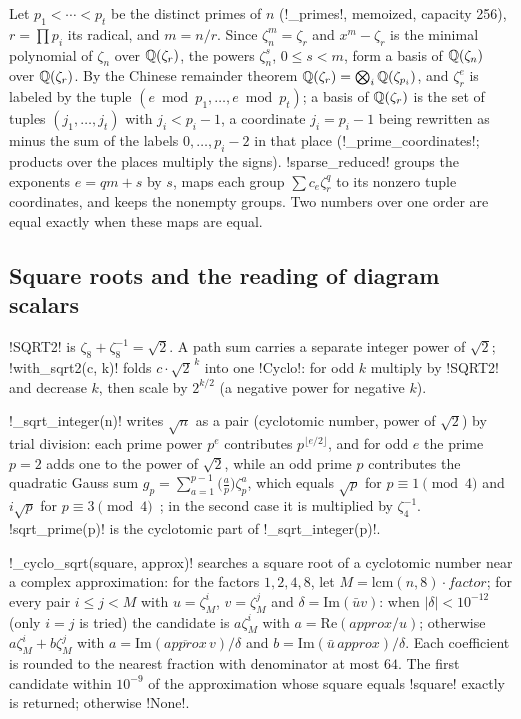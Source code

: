 \begin{definition}\label{def:algebra-cyclo-basis}
Let $p_1<\cdots<p_t$ be the distinct primes of $n$ (\py!_primes!, memoized, capacity 256), $r=\prod p_i$ its radical, and $m=n/r$. Since $\zeta_n^m=\zeta_r$ and $x^m-\zeta_r$ is the minimal polynomial of $\zeta_n$ over $\mathbb{Q}(\zeta_r)$, the powers $\zeta_n^s$, $0\le s<m$, form a basis of $\mathbb{Q}(\zeta_n)$ over $\mathbb{Q}(\zeta_r)$. By the Chinese remainder theorem $\mathbb{Q}(\zeta_r)=\bigotimes_i\mathbb{Q}(\zeta_{p_i})$, and $\zeta_r^e$ is labeled by the tuple $(e\bmod p_1,\ldots,e\bmod p_t)$; a basis of $\mathbb{Q}(\zeta_r)$ is the set of tuples $(j_1,\ldots,j_t)$ with $j_i<p_i-1$, a coordinate $j_i=p_i-1$ being rewritten as minus the sum of the labels $0,\ldots,p_i-2$ in that place (\py!_prime_coordinates!; products over the places multiply the signs). \py!sparse_reduced! groups the exponents $e=qm+s$ by $s$, maps each group $\sum c_e\zeta_r^q$ to its nonzero tuple coordinates, and keeps the nonempty groups. Two numbers over one order are equal exactly when these maps are equal.
\end{definition}

\subsection{Square roots and the reading of diagram scalars}

\py!SQRT2! is $\zeta_8+\zeta_8^{-1}=\sqrt2$. A path sum carries a separate integer power of $\sqrt2$; \py!with_sqrt2(c, k)! folds $c\cdot\sqrt2^{\,k}$ into one \py!Cyclo!: for odd $k$ multiply by \py!SQRT2! and decrease $k$, then scale by $2^{k/2}$ (a negative power for negative $k$).

\py!_sqrt_integer(n)! writes $\sqrt n$ as a pair (cyclotomic number, power of $\sqrt2$) by trial division: each prime power $p^e$ contributes $p^{\lfloor e/2\rfloor}$, and for odd $e$ the prime $p=2$ adds one to the power of $\sqrt2$, while an odd prime $p$ contributes the quadratic Gauss sum $g_p=\sum_{a=1}^{p-1}\bigl(\tfrac ap\bigr)\zeta_p^a$, which equals $\sqrt p$ for $p\equiv1\pmod4$ and $i\sqrt p$ for $p\equiv3\pmod4$~\cite{berndt1998gauss}; in the second case it is multiplied by $\zeta_4^{-1}$. \py!sqrt_prime(p)! is the cyclotomic part of \py!_sqrt_integer(p)!.

\py!_cyclo_sqrt(square, approx)! searches a square root of a cyclotomic number near a complex approximation: for the factors $1,2,4,8$, let $M=\mathrm{lcm}(n,8)\cdot\mathit{factor}$; for every pair $i\le j<M$ with $u=\zeta_M^i$, $v=\zeta_M^j$ and $\delta=\mathrm{Im}(\bar uv)$: when $|\delta|<10^{-12}$ (only $i=j$ is tried) the candidate is $a\zeta_M^i$ with $a=\mathrm{Re}(\mathit{approx}/u)$; otherwise $a\zeta_M^i+b\zeta_M^j$ with $a=\mathrm{Im}(\overline{\mathit{approx}}\,v)/\delta$ and $b=\mathrm{Im}(\bar u\,\mathit{approx})/\delta$. Each coefficient is rounded to the nearest fraction with denominator at most $64$. The first candidate within $10^{-9}$ of the approximation whose square equals \code!square! exactly is returned; otherwise \py!None!.

